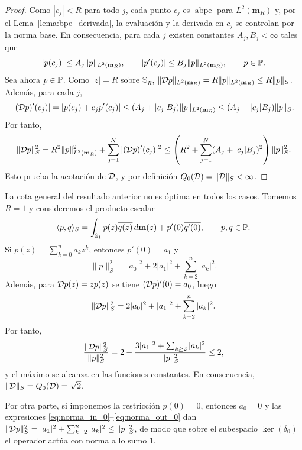 \begin{proof}
	Como $|c_j|<R$ para todo $j$, cada punto $c_j$ es $\operatorname{abpe}$ para $L^2(\mathbf{m}_R)$ y, por el Lema~\ref{lema:bpe_derivada}, la evaluación y la derivada en $c_j$ se controlan por la norma base. En consecuencia, para cada $j$ existen constantes $A_j,B_j<\infty$ tales que
	\[
		|p(c_j)|\le A_j\|p\|_{L^2(\mathbf{m}_R)},
		\qquad
		|p'(c_j)|\le B_j\|p\|_{L^2(\mathbf{m}_R)},
		\qquad p\in\mathbb{P}.
	\]
	Sea ahora $p\in\mathbb{P}$. Como $|z|=R$ sobre $\mathbb{S}_R$, $\|\mathcal{D} p\|_{L^2(\mathbf{m}_R)}=R\|p\|_{L^2(\mathbf{m}_R)}\le R\|p\|_S$.
	Además, para cada $j$,
	\[
		|(\mathcal{D} p)'(c_j)|=|p(c_j)+c_jp'(c_j)|
		\le
		(A_j+|c_j|B_j)\|p\|_{L^2(\mathbf{m}_R)}
		\le
		(A_j+|c_j|B_j)\|p\|_S.
	\]
	Por tanto,
	\[
		\|\mathcal{D} p\|_S^2
		=
		R^2\|p\|_{L^2(\mathbf{m}_R)}^2
		+
		\sum_{j=1}^N |(\mathcal{D} p)'(c_j)|^2
		\le
		\left(R^2+\sum_{j=1}^N (A_j+|c_j|B_j)^2\right)\|p\|_S^2.
	\]
	Esto prueba la acotación de $\mathcal{D}$, y por definición $Q_0(\mathcal{D})=\|\mathcal{D}\|_S<\infty$.
\end{proof}

\begin{exm}\label{exm:c0_raiz2}
	La cota general del resultado anterior no es óptima en todos los casos. Tomemos $R=1$ y consideremos el producto escalar
	\[
		\langle p,q\rangle_S
		=
		\int_{\mathbb{S}_1} p(z)\overline{q(z)}\,d\mathbf m(z)
		+
		p'(0)\overline{q'(0)},
		\qquad p,q\in\mathbb{P}.
	\]
	Si $p(z)=\sum_{k=0}^n a_k z^k$, entonces $p'(0)=a_1$ y
	\begin{equation}\label{eq:norma_in_0}
		\|p\|_S^2=|a_0|^2+2|a_1|^2+\sum_{k=2}^n |a_k|^2.
	\end{equation}
	Además, para $\mathcal{D} p(z)=zp(z)$ se tiene $(\mathcal{D} p)'(0)=a_0$, luego
	\begin{equation}\label{eq:norma_out_0}
		\|\mathcal{D} p\|_S^2=2|a_0|^2+|a_1|^2+\sum_{k=2}^n |a_k|^2.
	\end{equation}
	Por tanto,
	\begin{equation}\label{eq:ratio_c0_raiz2}
		\frac{\|\mathcal{D} p\|_S^2}{\|p\|_S^2}
		=
		2-
		\frac{3|a_1|^2+\sum_{k\ge2}|a_k|^2}{\|p\|_S^2}
		\le2,
	\end{equation}
	y el máximo se alcanza en las funciones constantes. En consecuencia, $\|\mathcal{D}\|_S=Q_0(\mathcal{D})=\sqrt2$.

	Por otra parte, si imponemos la restricción $p(0)=0$, entonces $a_0=0$ y las expresiones \eqref{eq:norma_in_0}--\eqref{eq:norma_out_0} dan $\|\mathcal{D} p\|_S^2=|a_1|^2+\sum_{k=2}^n |a_k|^2\le \|p\|_S^2$,
	de modo que sobre el subespacio $\ker(\delta_0)$ el operador actúa con norma a lo sumo $1$.
\end{exm}

